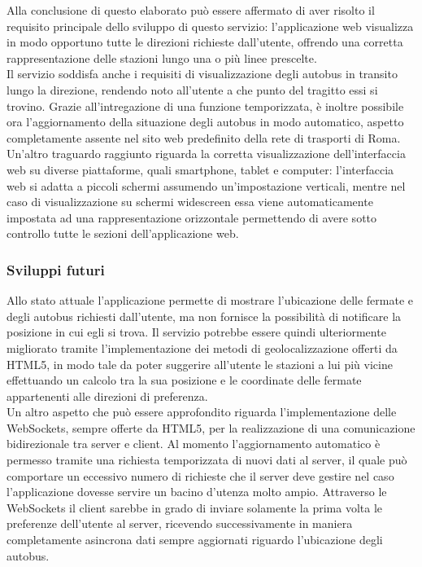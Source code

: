 Alla conclusione di questo elaborato può essere affermato di aver risolto il requisito principale dello sviluppo di questo servizio: l'applicazione web visualizza in modo opportuno tutte le direzioni richieste dall'utente, offrendo una corretta rappresentazione delle stazioni lungo una o più linee prescelte.\\

Il servizio soddisfa anche i requisiti di visualizzazione degli autobus in transito lungo la direzione, rendendo noto all'utente a che punto del tragitto essi si trovino. Grazie all'intregazione di una funzione temporizzata, è inoltre possibile ora l'aggiornamento della situazione degli autobus in modo automatico, aspetto completamente assente nel sito web predefinito della rete di trasporti di Roma.\\

Un'altro traguardo raggiunto riguarda la corretta visualizzazione dell'interfaccia web su diverse piattaforme, quali smartphone, tablet e computer: l'interfaccia web si adatta a piccoli schermi assumendo un'impostazione verticali, mentre nel caso di visualizzazione su schermi widescreen essa viene automaticamente impostata ad una rappresentazione orizzontale permettendo di avere sotto controllo tutte le sezioni dell'applicazione web.

\newpage

\subsubsection{Sviluppi futuri} %
\label{ssub:sviluppi_futuri}

Allo stato attuale l'applicazione permette di mostrare l'ubicazione delle fermate e degli autobus richiesti dall'utente, ma non fornisce la possibilità di notificare la posizione in cui egli si trova. Il servizio potrebbe essere quindi ulteriormente migliorato tramite l'implementazione dei metodi di geolocalizzazione offerti da HTML5, in modo tale da poter suggerire all'utente le stazioni a lui più vicine effettuando un calcolo tra la sua posizione e le coordinate delle fermate appartenenti alle direzioni di preferenza.\\

Un altro aspetto che può essere approfondito riguarda l'implementazione delle WebSockets, sempre offerte da HTML5, per la realizzazione di una comunicazione bidirezionale tra server e client. Al momento l'aggiornamento automatico è permesso tramite una richiesta temporizzata di nuovi dati al server, il quale può comportare un eccessivo numero di richieste che il server deve gestire nel caso l'applicazione dovesse servire un bacino d'utenza molto ampio. Attraverso le WebSockets il client sarebbe in grado di inviare solamente la prima volta le preferenze dell'utente al server, ricevendo successivamente in maniera completamente asincrona dati sempre aggiornati riguardo l'ubicazione degli autobus.

